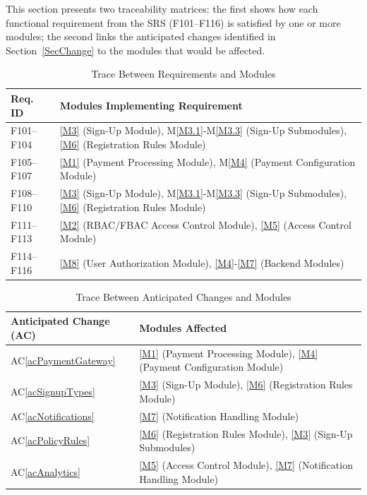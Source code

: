 \documentclass[12pt, titlepage]{article}
\newcommand{\acref}[1]{AC\ref{#1}}
\newcommand{\mref}[1]{M\ref{#1}}
\begin{document}
This section presents two traceability matrices: the first shows how each
functional requirement from the SRS (F101–F116) is satisfied by one or more
modules; the second links the anticipated changes identified in
Section~\ref{SecChange} to the modules that would be affected.

\begin{table}[H]
\centering
\begin{tabular}{p{} p{}}
\toprule
\textbf{Req. ID} & \textbf{Modules Implementing Requirement}\\
\midrule
F101--F104 & \ref{M3} (Sign-Up Module), \mref{M3.1}-\mref{M3.3} (Sign-Up Submodules), \ref{M6} (Registration Rules Module)\\
F105--F107 & \ref{M1} (Payment Processing Module), \mref{M4} (Payment Configuration Module)\\
F108--F110 & \ref{M3} (Sign-Up Module), \mref{M3.1}-\mref{M3.3} (Sign-Up Submodules), \ref{M6} (Registration Rules Module)\\
F111--F113 & \ref{M2} (RBAC/FBAC Access Control Module), \ref{M5} (Access Control Module)\\
F114--F116 & \ref{M8} (User Authorization Module), \ref{M4}-\ref{M7} (Backend Modules)\\
\bottomrule
\end{tabular}
\caption{Trace Between Requirements and Modules}
\label{TblRT}
\end{table}

\begin{table}[H]
\centering
\begin{tabular}{p{} p{}}
\toprule
\textbf{Anticipated Change (AC)} & \textbf{Modules Affected}\\
\midrule
\acref{acPaymentGateway} & \ref{M1} (Payment Processing Module), \ref{M4} (Payment Configuration Module)\\
\acref{acSignupTypes} & \ref{M3} (Sign-Up Module), \ref{M6} (Registration Rules Module)\\
\acref{acNotifications} & \ref{M7} (Notification Handling Module)\\
\acref{acPolicyRules} & \ref{M6} (Registration Rules Module), \ref{M3} (Sign-Up Submodules)\\
\acref{acAnalytics} & \ref{M5} (Access Control Module), \ref{M7} (Notification Handling Module)\\
\bottomrule
\end{tabular}
\caption{Trace Between Anticipated Changes and Modules}
\label{TblACT}
\end{table}
\end{document}
